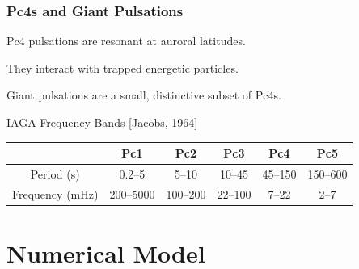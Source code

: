 \documentclass{beamer}
\begin{document}

\begin{frame}
\frametitle{Pc4s and Giant Pulsations}

\begin{wideitemize}
\item Pc4 pulsations are resonant at auroral latitudes. 
\item They interact with trapped energetic particles. 
\item Giant pulsations are a small, distinctive subset of Pc4s.  
\end{wideitemize}

\vfill

\begin{center}
IAGA Frequency Bands [Jacobs, 1964]
\begin{tabular}{ @{\extracolsep{\fill}} cccccc @{\extracolsep{\fill}} }
  \hline
  & Pc1 & Pc2 & Pc3 & Pc4 & Pc5 \\
  \hline
  Period (\si{\second}) & 0.2--5    & 5--10    & 10--45  & 45--150 & 150--600 \\
  Frequency (\si{\mHz}) & 200--5000 & 100--200 & 22--100 & 7--22   & 2--7     \\
  \hline
\end{tabular}
\end{center}

\end{frame}


\section{Numerical Model}

\end{document}
